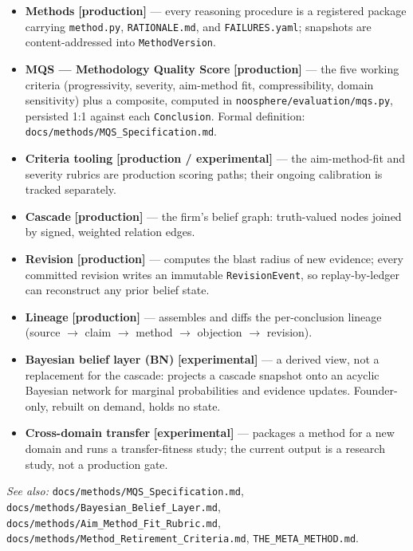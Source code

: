 \documentclass[11pt]{article}
\begin{document}
\begin{itemize}[leftmargin=1.4em]
  \item \textbf{Methods} \textbf{[production]} --- every reasoning procedure is
  a registered package carrying \texttt{method.py}, \texttt{RATIONALE.md}, and
  \texttt{FAILURES.yaml}; snapshots are content-addressed into
  \texttt{MethodVersion}.
  \item \textbf{MQS --- Methodology Quality Score} \textbf{[production]} --- the
  five working criteria (progressivity, severity, aim-method fit,
  compressibility, domain sensitivity) plus a composite, computed in
  \texttt{noosphere/evaluation/mqs.py}, persisted 1:1 against each
  \texttt{Conclusion}. Formal definition: \texttt{docs/methods/MQS\_Specification.md}.
  \item \textbf{Criteria tooling} \textbf{[production / experimental]} --- the
  aim-method-fit and severity rubrics are production scoring paths; their
  ongoing calibration is tracked separately.
  \item \textbf{Cascade} \textbf{[production]} --- the firm's belief graph:
  truth-valued nodes joined by signed, weighted relation edges.
  \item \textbf{Revision} \textbf{[production]} --- computes the blast radius
  of new evidence; every committed revision writes an immutable
  \texttt{RevisionEvent}, so replay-by-ledger can reconstruct any prior belief
  state.
  \item \textbf{Lineage} \textbf{[production]} --- assembles and diffs the
  per-conclusion lineage (source $\rightarrow$ claim $\rightarrow$ method
  $\rightarrow$ objection $\rightarrow$ revision).
  \item \textbf{Bayesian belief layer (BN)} \textbf{[experimental]} --- a
  derived view, not a replacement for the cascade: projects a cascade snapshot
  onto an acyclic Bayesian network for marginal probabilities and evidence
  updates. Founder-only, rebuilt on demand, holds no state.
  \item \textbf{Cross-domain transfer} \textbf{[experimental]} --- packages a
  method for a new domain and runs a transfer-fitness study; the current
  output is a research study, not a production gate.
\end{itemize}

\textit{See also:} \texttt{docs/methods/MQS\_Specification.md},
\texttt{docs/methods/Bayesian\_Belief\_Layer.md},
\texttt{docs/methods/Aim\_Method\_Fit\_Rubric.md},
\texttt{docs/methods/Method\_Retirement\_Criteria.md},
\texttt{THE\_META\_METHOD.md}.
\end{document}
